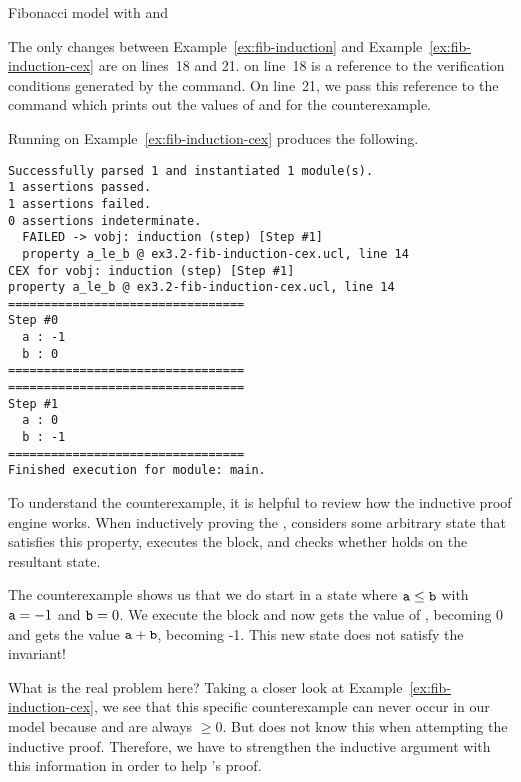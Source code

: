 \begin{uclidlisting}[htbp]
    
    \caption{\uclid{} Fibonacci model with  and }
    \label{ex:fib-induction-cex}
\end{uclidlisting}

The only changes between Example~\ref{ex:fib-induction} and Example~\ref{ex:fib-induction-cex} are on lines~18 and 21.  on line~18 is a reference to the verification conditions generated by the  command. On line~21, we pass this reference to the  command which prints out the values of  and  for the counterexample.

Running \uclid{} on Example~\ref{ex:fib-induction-cex} produces the following.

\begin{Verbatim}[frame=single, samepage=true]
Successfully parsed 1 and instantiated 1 module(s).
1 assertions passed.
1 assertions failed.
0 assertions indeterminate.
  FAILED -> vobj: induction (step) [Step #1] 
  property a_le_b @ ex3.2-fib-induction-cex.ucl, line 14
CEX for vobj: induction (step) [Step #1] 
property a_le_b @ ex3.2-fib-induction-cex.ucl, line 14
=================================
Step #0
  a : -1
  b : 0
=================================
=================================
Step #1
  a : 0
  b : -1
=================================
Finished execution for module: main.
\end{Verbatim}

To understand the counterexample, it is helpful to review how the inductive proof engine works. When inductively proving the  , \uclid{} considers some arbitrary state that satisfies this property, executes the  block, and checks whether  holds on the resultant state.

The counterexample shows us that we do start in a state where $\texttt{a} \le \texttt{b}$ with $\texttt{a}=-1$ and $\texttt{b}=0$. We execute the  block and now  gets the value of , becoming 0 and  gets the value $\texttt{a} + \texttt{b}$, becoming -1. This new state does not satisfy the invariant!

What is the real problem here? Taking a closer look at Example~\ref{ex:fib-induction-cex}, we see that this specific counterexample can never occur in our model because  and  are always $\ge 0$. But \uclid{} does not know this when attempting the inductive proof. Therefore, we have to strengthen the inductive argument with this information in order to help \uclid{}'s proof.

